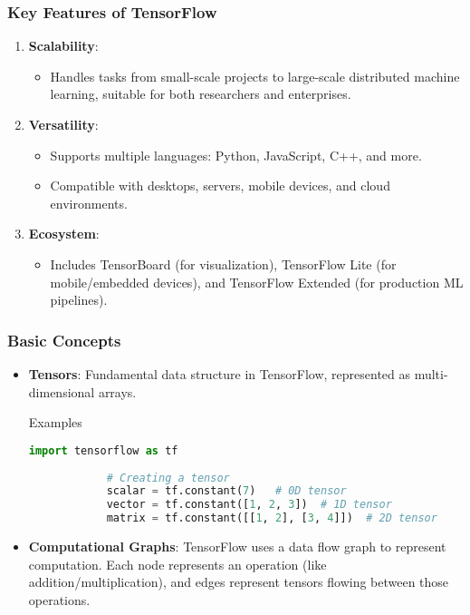 \documentclass[aspectratio=169]{beamer}
\begin{document}
\begin{frame}[fragile]
    \frametitle{Key Features of TensorFlow}
    \begin{enumerate}
        \item \textbf{Scalability}:
        \begin{itemize}
            \item Handles tasks from small-scale projects to large-scale distributed machine learning, suitable for both researchers and enterprises.
        \end{itemize}
        
        \item \textbf{Versatility}:
        \begin{itemize}
            \item Supports multiple languages: Python, JavaScript, C++, and more.
            \item Compatible with desktops, servers, mobile devices, and cloud environments.
        \end{itemize}
        
        \item \textbf{Ecosystem}:
        \begin{itemize}
            \item Includes TensorBoard (for visualization), TensorFlow Lite (for mobile/embedded devices), and TensorFlow Extended (for production ML pipelines).
        \end{itemize}
    \end{enumerate}
\end{frame}

\begin{frame}[fragile]
    \frametitle{Basic Concepts}
    \begin{itemize}
        \item \textbf{Tensors}: Fundamental data structure in TensorFlow, represented as multi-dimensional arrays.
        \begin{block}{Examples}
            \begin{lstlisting}[language=Python]
            import tensorflow as tf
            
            # Creating a tensor
            scalar = tf.constant(7)   # 0D tensor
            vector = tf.constant([1, 2, 3])  # 1D tensor
            matrix = tf.constant([[1, 2], [3, 4]])  # 2D tensor
            \end{lstlisting}
            \end{block}
        
        \item \textbf{Computational Graphs}: TensorFlow uses a data flow graph to represent computation. Each node represents an operation (like addition/multiplication), and edges represent tensors flowing between those operations.
    \end{itemize}
\end{frame}
\end{document}
